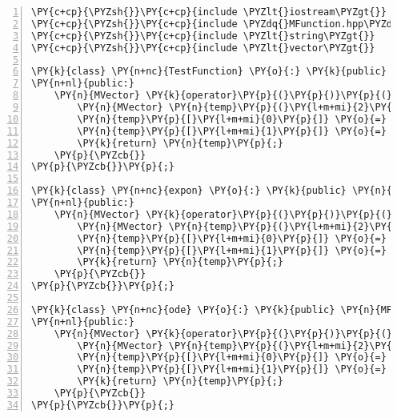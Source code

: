 \begin{Verbatim}[tabsize=2,commandchars=\\\{\},numbers=left,firstnumber=1,stepnumber=1]
\PY{c+cp}{\PYZsh{}}\PY{c+cp}{include \PYZlt{}iostream\PYZgt{}}
\PY{c+cp}{\PYZsh{}}\PY{c+cp}{include \PYZdq{}MFunction.hpp\PYZdq{}}
\PY{c+cp}{\PYZsh{}}\PY{c+cp}{include \PYZlt{}string\PYZgt{}}
\PY{c+cp}{\PYZsh{}}\PY{c+cp}{include \PYZlt{}vector\PYZgt{}}

\PY{k}{class} \PY{n+nc}{TestFunction} \PY{o}{:} \PY{k}{public} \PY{n}{MFunction} \PY{p}{\PYZob{}}
\PY{n+nl}{public:}
	\PY{n}{MVector} \PY{k}{operator}\PY{p}{(}\PY{p}{)}\PY{p}{(}\PY{k}{const} \PY{k+kt}{double}\PY{o}{\PYZam{}} \PY{n}{x}\PY{p}{,} \PY{k}{const} \PY{n}{MVector}\PY{o}{\PYZam{}} \PY{n}{y}\PY{p}{)} \PY{p}{\PYZob{}}
		\PY{n}{MVector} \PY{n}{temp}\PY{p}{(}\PY{l+m+mi}{2}\PY{p}{)}\PY{p}{;}
		\PY{n}{temp}\PY{p}{[}\PY{l+m+mi}{0}\PY{p}{]} \PY{o}{=} \PY{n}{y}\PY{p}{[}\PY{l+m+mi}{0}\PY{p}{]} \PY{o}{+} \PY{n}{x}\PY{o}{*}\PY{n}{y}\PY{p}{[}\PY{l+m+mi}{1}\PY{p}{]}\PY{p}{;}
		\PY{n}{temp}\PY{p}{[}\PY{l+m+mi}{1}\PY{p}{]} \PY{o}{=} \PY{n}{x}\PY{o}{*}\PY{n}{y}\PY{p}{[}\PY{l+m+mi}{0}\PY{p}{]} \PY{o}{\PYZhy{}} \PY{n}{y}\PY{p}{[}\PY{l+m+mi}{1}\PY{p}{]}\PY{p}{;}
		\PY{k}{return} \PY{n}{temp}\PY{p}{;}
	\PY{p}{\PYZcb{}}
\PY{p}{\PYZcb{}}\PY{p}{;}

\PY{k}{class} \PY{n+nc}{expon} \PY{o}{:} \PY{k}{public} \PY{n}{MFunction} \PY{p}{\PYZob{}}
\PY{n+nl}{public:}
	\PY{n}{MVector} \PY{k}{operator}\PY{p}{(}\PY{p}{)}\PY{p}{(}\PY{k}{const} \PY{k+kt}{double}\PY{o}{\PYZam{}} \PY{n}{x}\PY{p}{,} \PY{k}{const} \PY{n}{MVector}\PY{o}{\PYZam{}} \PY{n}{y}\PY{p}{)} \PY{p}{\PYZob{}}
		\PY{n}{MVector} \PY{n}{temp}\PY{p}{(}\PY{l+m+mi}{2}\PY{p}{)}\PY{p}{;}
		\PY{n}{temp}\PY{p}{[}\PY{l+m+mi}{0}\PY{p}{]} \PY{o}{=} \PY{n}{x}\PY{p}{;}
		\PY{n}{temp}\PY{p}{[}\PY{l+m+mi}{1}\PY{p}{]} \PY{o}{=} \PY{n}{y}\PY{p}{[}\PY{l+m+mi}{1}\PY{p}{]}\PY{p}{;}
		\PY{k}{return} \PY{n}{temp}\PY{p}{;}
	\PY{p}{\PYZcb{}}
\PY{p}{\PYZcb{}}\PY{p}{;}

\PY{k}{class} \PY{n+nc}{ode} \PY{o}{:} \PY{k}{public} \PY{n}{MFunction} \PY{p}{\PYZob{}}
\PY{n+nl}{public:}
	\PY{n}{MVector} \PY{k}{operator}\PY{p}{(}\PY{p}{)}\PY{p}{(}\PY{k}{const} \PY{k+kt}{double}\PY{o}{\PYZam{}} \PY{n}{x}\PY{p}{,} \PY{k}{const} \PY{n}{MVector}\PY{o}{\PYZam{}} \PY{n}{y}\PY{p}{)} \PY{p}{\PYZob{}}
		\PY{n}{MVector} \PY{n}{temp}\PY{p}{(}\PY{l+m+mi}{2}\PY{p}{)}\PY{p}{;}
		\PY{n}{temp}\PY{p}{[}\PY{l+m+mi}{0}\PY{p}{]} \PY{o}{=} \PY{n}{y}\PY{p}{[}\PY{l+m+mi}{1}\PY{p}{]}\PY{p}{;}
		\PY{n}{temp}\PY{p}{[}\PY{l+m+mi}{1}\PY{p}{]} \PY{o}{=} \PY{l+m+mi}{4} \PY{o}{+} \PY{p}{(}\PY{l+m+mf}{1.}\PY{o}{/}\PY{l+m+mf}{4.}\PY{p}{)}\PY{o}{*}\PY{n}{x}\PY{o}{*}\PY{n}{x}\PY{o}{*}\PY{n}{x} \PY{o}{\PYZhy{}} \PY{p}{(}\PY{l+m+mf}{1.}\PY{o}{/}\PY{l+m+mf}{8.}\PY{p}{)}\PY{o}{*}\PY{n}{y}\PY{p}{[}\PY{l+m+mi}{0}\PY{p}{]}\PY{o}{*}\PY{n}{y}\PY{p}{[}\PY{l+m+mi}{1}\PY{p}{]}\PY{p}{;}
		\PY{k}{return} \PY{n}{temp}\PY{p}{;}
	\PY{p}{\PYZcb{}}
\PY{p}{\PYZcb{}}\PY{p}{;}
\end{Verbatim}
